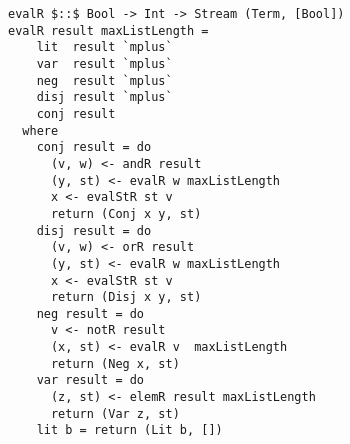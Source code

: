 

\begin{figure}[!t]
  \centering
  \begin{minipage}{0.49\textwidth}
    \begin{lstlisting}[label={eval_r}, caption={Functional implementation of the direction \lstinline{evalo out out in}}, captionpos=b, frame=tb]
evalR $::$ Bool -> Int -> Stream (Term, [Bool])
evalR result maxListLength =
    lit  result `mplus`
    var  result `mplus`
    neg  result `mplus`
    disj result `mplus`
    conj result
  where
    conj result = do
      (v, w) <- andR result
      (y, st) <- evalR w maxListLength
      x <- evalStR st v
      return (Conj x y, st)
    disj result = do
      (v, w) <- orR result
      (y, st) <- evalR w maxListLength
      x <- evalStR st v
      return (Disj x y, st)
    neg result = do
      v <- notR result
      (x, st) <- evalR v  maxListLength
      return (Neg x, st)
    var result = do
      (z, st) <- elemR result maxListLength
      return (Var z, st)
    lit b = return (Lit b, [])
    \end{lstlisting}
  \end{minipage}
\end{figure}

